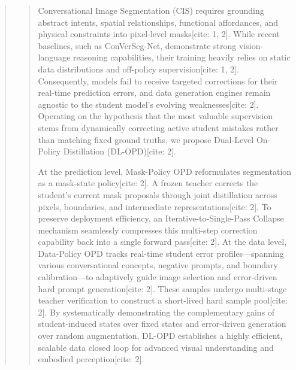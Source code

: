 \begin{abstract}

\begin{abstract}
Conversational Image Segmentation (CIS) requires grounding abstract intents, spatial relationships, functional affordances, and physical constraints into pixel-level masks[cite: 1, 2]. While recent baselines, such as ConVerSeg-Net, demonstrate strong vision-language reasoning capabilities, their training heavily relies on static data distributions and off-policy supervision[cite: 1, 2]. Consequently, models fail to receive targeted corrections for their real-time prediction errors, and data generation engines remain agnostic to the student model's evolving weaknesses[cite: 2]. Operating on the hypothesis that the most valuable supervision stems from dynamically correcting active student mistakes rather than matching fixed ground truths, we propose Dual-Level On-Policy Distillation (DL-OPD)[cite: 2]. 

At the prediction level, Mask-Policy OPD reformulates segmentation as a mask-state policy[cite: 2]. A frozen teacher corrects the student's current mask proposals through joint distillation across pixels, boundaries, and intermediate representations[cite: 2]. To preserve deployment efficiency, an Iterative-to-Single-Pass Collapse mechanism seamlessly compresses this multi-step correction capability back into a single forward pass[cite: 2]. At the data level, Data-Policy OPD tracks real-time student error profiles—spanning various conversational concepts, negative prompts, and boundary calibration—to adaptively guide image selection and error-driven hard prompt generation[cite: 2]. These samples undergo multi-stage teacher verification to construct a short-lived hard sample pool[cite: 2]. By systematically demonstrating the complementary gains of student-induced states over fixed states and error-driven generation over random augmentation, DL-OPD establishes a highly efficient, scalable data closed loop for advanced visual understanding and embodied perception[cite: 2].
\end{abstract}


\end{abstract}